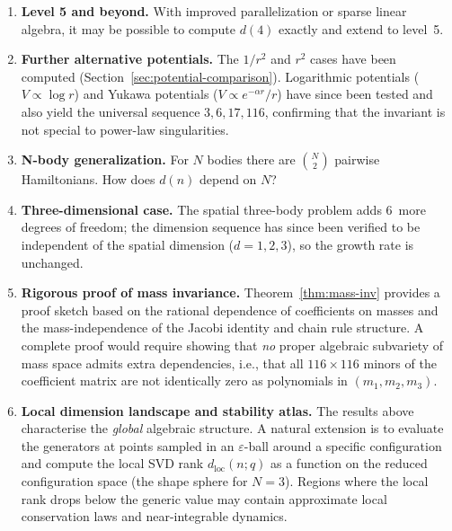 \documentclass[11pt,a4paper]{article}
\theoremstyle{remark}
\begin{document}
\begin{enumerate}
  \item \textbf{Level 5 and beyond.} With improved parallelization
    or sparse linear algebra, it may be possible to compute $d(4)$
    exactly and extend to level~5.

  \item \textbf{Further alternative potentials.}  The $1/r^2$
    and $r^2$ cases have been computed (Section~\ref{sec:potential-comparison}).
    Logarithmic potentials ($V \propto \log r$) and Yukawa
    potentials ($V \propto e^{-\alpha r}/r$) have since been
    tested and also yield the universal sequence
    $3, 6, 17, 116$, confirming that the invariant is not
    special to power-law singularities.

  \item \textbf{N-body generalization.}  For $N$ bodies there are
    $\binom{N}{2}$ pairwise Hamiltonians.  How does $d(n)$
    depend on $N$?

  \item \textbf{Three-dimensional case.}  The spatial three-body
    problem adds 6~more degrees of freedom; the dimension
    sequence has since been verified to be independent of the
    spatial dimension ($d = 1, 2, 3$), so the growth rate is
    unchanged.

  \item \textbf{Rigorous proof of mass invariance.}
    Theorem~\ref{thm:mass-inv} provides a proof sketch based on
    the rational dependence of coefficients on masses and the
    mass-independence of the Jacobi identity and chain rule
    structure.  A complete proof would require showing that
    \emph{no} proper algebraic subvariety of mass space admits
    extra dependencies, i.e., that all $116 \times 116$ minors
    of the coefficient matrix are not identically zero as
    polynomials in $(m_1, m_2, m_3)$.

  \item \textbf{Local dimension landscape and stability atlas.}
    The results above characterise the \emph{global} algebraic
    structure.  A natural extension is to evaluate the generators
    at points sampled in an $\varepsilon$-ball around a specific
    configuration and compute the local SVD rank
    $d_{\mathrm{loc}}(n; q)$ as a function on the reduced
    configuration space (the shape sphere for $N=3$).  Regions
    where the local rank drops below the generic value may contain
    approximate local conservation laws and near-integrable dynamics.


\end{enumerate}
\end{document}
